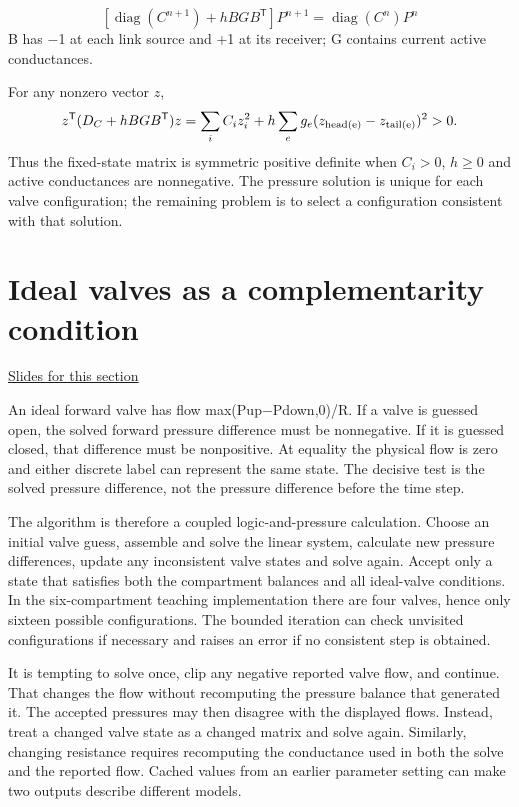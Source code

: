 \documentclass[11pt,letterpaper]{article}
\theoremstyle{definition}\newtheorem{definition}{Definition}\newtheorem{example}{Example}
\numberwithin{equation}{section}
\begin{document}
\[
[\operatorname{diag}(C^{n+1})+h B G B^{\mathsf T}]P^{n+1}=\operatorname{diag}(C^n)P^n
\]
B has \ensuremath{-}1 at each link source and +1 at its receiver; G contains current active conductances.

For any nonzero vector $z$,
\[
 z^{\mathsf T}(D_C+hBGB^{\mathsf T})z
   =\sum_iC_i z_i^2+h\sum_e g_e(z_{\rm head(e)}-z_{\rm tail(e)})^2>0.
\]
Thus the fixed-state matrix is symmetric positive definite when $C_i>0$, $h\ge0$ and active conductances are nonnegative. The pressure solution is unique for each valve configuration; the remaining problem is to select a configuration consistent with that solution.
\section{Ideal valves as a complementarity condition}
\hypertarget{note-ideal-valves-as-a-complementarity-condition}{}\label{note:ideal-valves-as-a-complementarity-condition}
{\small \href{slides.html\#frame=the-ideal-valve-law\&step=1}{Slides for this section}}\par
An ideal forward valve has flow max(Pup\ensuremath{-}Pdown,0)/R. If a valve is guessed open, the solved forward pressure difference must be nonnegative. If it is guessed closed, that difference must be nonpositive. At equality the physical flow is zero and either discrete label can represent the same state. The decisive test is the solved pressure difference, not the pressure difference before the time step.

The algorithm is therefore a coupled logic-and-pressure calculation. Choose an initial valve guess, assemble and solve the linear system, calculate new pressure differences, update any inconsistent valve states and solve again. Accept only a state that satisfies both the compartment balances and all ideal-valve conditions. In the six-compartment teaching implementation there are four valves, hence only sixteen possible configurations. The bounded iteration can check unvisited configurations if necessary and raises an error if no consistent step is obtained.

It is tempting to solve once, clip any negative reported valve flow, and continue. That changes the flow without recomputing the pressure balance that generated it. The accepted pressures may then disagree with the displayed flows. Instead, treat a changed valve state as a changed matrix and solve again. Similarly, changing resistance requires recomputing the conductance used in both the solve and the reported flow. Cached values from an earlier parameter setting can make two outputs describe different models.
\end{document}
